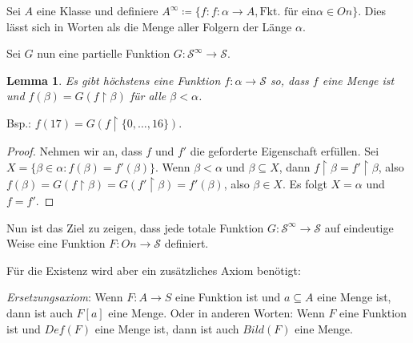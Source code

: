 \documentclass[german]{article}
\theoremstyle{break}
\theoremstyle{def_style}
\theoremstyle{def_style}
\theoremstyle{lemma_style}
\newtheorem{lemma}{Lemma}[subsection]
\begin{document}
Sei $A$ eine Klasse und definiere $A^\infty\coloneqq\{f : f:\alpha\to A, \text{Fkt. für ein} \alpha\in On\}$. Dies lässt sich in Worten als die Menge aller Folgern der Länge $\alpha$.

Sei $G$ nun eine partielle Funktion $G:\mathcal{S}^\infty\to\mathcal{S}$.

\begin{lemma}
	Es gibt höchstens eine Funktion $f:\alpha\to \mathcal{S}$ so, dass $f$ eine Menge ist und $f(\beta)=G(f\upharpoonright\beta)$ für alle $\beta < \alpha$.
\end{lemma}
Bsp.: $f(17)=G(f\upharpoonright\{0,\dots,16\})$.
\begin{proof}
	Nehmen wir an, dass $f$ und $f'$ die geforderte Eigenschaft erfüllen. Sei $X=\{\beta \in\alpha : f(\beta)=f'(\beta)\}$. Wenn $\beta < \alpha$ und $\beta\subseteq X$, dann $f\upharpoonright\beta =f'\upharpoonright\beta$, also $f(\beta)=G(f\upharpoonright\beta)=G(f'\upharpoonright\beta)=f'(\beta)$, also $\beta\in X$. Es folgt $X=\alpha$ und $f=f'$.
\end{proof}

Nun ist das Ziel zu zeigen, dass jede totale Funktion $G:\mathcal{S}^\infty\to\mathcal{S}$ auf eindeutige Weise eine Funktion $F:On\to\mathcal{S}$ definiert.

Für die Existenz wird aber ein zusätzliches Axiom benötigt:

\textit{Ersetzungsaxiom}: Wenn $F:A\to S$ eine Funktion ist und $a\subseteq A$ eine Menge ist, dann ist auch $F[a]$ eine Menge. Oder in anderen Worten: Wenn $F$ eine Funktion ist und $Def(F)$ eine Menge ist, dann ist auch $Bild(F)$ eine Menge.
\end{document}
